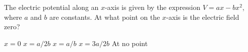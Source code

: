 \begin{questions}\setcounter{question}{11}\question
The electric potential along an $x$-axis is given by the expression $V=a x-b x^{2}$, where $a$ and $b$ are constants. At what point on the $x$-axis is the electric field zero?

\begin{oneparchoices}
\choice $x = 0$
\choice $x = a / 2b$
\choice $x = a / b$
\choice $x = 3a / 2b$
\choice At no point
\end{oneparchoices}\end{questions}

